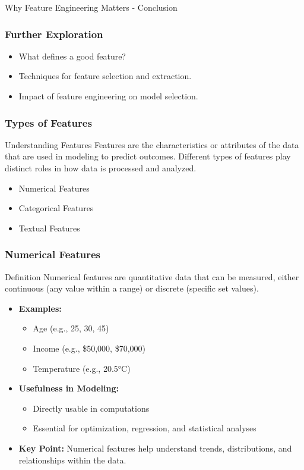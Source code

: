 \documentclass[aspectratio=169]{beamer}
\begin{document}
\begin{frame}[fragile]{Why Feature Engineering Matters - Conclusion}
    \frametitle{Further Exploration}
    \begin{itemize}
        \item What defines a good feature?
        \item Techniques for feature selection and extraction.
        \item Impact of feature engineering on model selection.
    \end{itemize}
\end{frame}

\begin{frame}
    \frametitle{Types of Features}
    \begin{block}{Understanding Features}
        Features are the characteristics or attributes of the data that are used in modeling to predict outcomes. Different types of features play distinct roles in how data is processed and analyzed.
    \end{block}
    \begin{itemize}
        \item Numerical Features
        \item Categorical Features
        \item Textual Features
    \end{itemize}
\end{frame}

\begin{frame}
    \frametitle{Numerical Features}
    \begin{block}{Definition}
        Numerical features are quantitative data that can be measured, either continuous (any value within a range) or discrete (specific set values).
    \end{block}
    \begin{itemize}
        \item \textbf{Examples:}
            \begin{itemize}
                \item Age (e.g., 25, 30, 45)
                \item Income (e.g., \$50,000, \$70,000)
                \item Temperature (e.g., 20.5°C)
            \end{itemize}
        \item \textbf{Usefulness in Modeling:}
            \begin{itemize}
                \item Directly usable in computations
                \item Essential for optimization, regression, and statistical analyses
            \end{itemize}
        \item \textbf{Key Point:} 
            Numerical features help understand trends, distributions, and relationships within the data.
    \end{itemize}
\end{frame}
\end{document}
